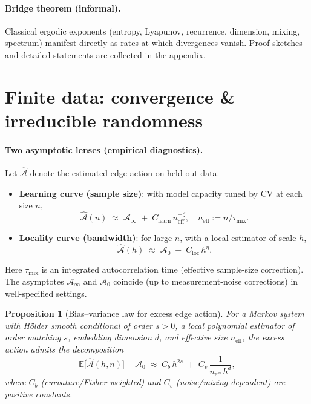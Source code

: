 \documentclass[11pt]{article}
\newtheorem{proposition}{Proposition}
\newcommand{\E}{\mathbb{E}}
\newcommand{\1}{\mathbf{1}}
\begin{document}
\paragraph{Bridge theorem (informal).}
Classical ergodic exponents (entropy, Lyapunov, recurrence, dimension, mixing, spectrum)
manifest directly as rates at which divergences vanish.
Proof sketches and detailed statements are collected in the appendix.

\section{Finite data: convergence \& irreducible randomness}

\paragraph{Two asymptotic lenses (empirical diagnostics).}
Let \(\widehat{\mathcal A}\) denote the estimated edge action on held-out data.
\begin{itemize}[leftmargin=1.7em,itemsep=1.5pt,topsep=2pt]
\item \textbf{Learning curve (sample size)}: with model capacity tuned by CV at each size \(n\),
\[
\widehat{\mathcal A}(n) \;\approx\; \mathcal A_\infty \;+\; C_{\mathrm{learn}}\, n_{\mathrm{eff}}^{-\zeta}, \quad n_{\mathrm{eff}}:=n/\tau_{\mathrm{mix}}.
\]
\item \textbf{Locality curve (bandwidth)}: for large \(n\), with a local estimator of scale \(h\),
\[
\widehat{\mathcal A}(h) \;\approx\; \mathcal A_0 \;+\; C_{\mathrm{loc}}\, h^{\eta}.
\]
\end{itemize}
Here \(\tau_{\mathrm{mix}}\) is an integrated autocorrelation time (effective sample-size correction). The asymptotes \(\mathcal A_\infty\) and \(\mathcal A_0\) coincide (up to measurement-noise corrections) in well-specified settings.

\begin{proposition}[Bias--variance law for excess edge action]
For a Markov system with Hölder smooth conditional of order \(s>0\), a local polynomial estimator of order matching \(s\), embedding dimension \(d\), and effective size \(n_{\mathrm{eff}}\), the excess action admits the decomposition
\[
\E\big[\widehat{\mathcal A}(h,n)\big]-\mathcal A_0
\;\approx\;
C_b\, h^{2s} \;+\; C_v\,\frac{1}{n_{\mathrm{eff}}\,h^{d}},
\]
where \(C_b\) (curvature/Fisher-weighted) and \(C_v\) (noise/mixing-dependent) are positive constants.
\end{proposition}
\end{document}
